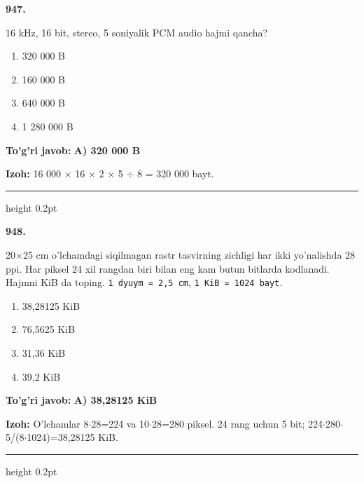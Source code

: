 \documentclass[10pt,a4paper,oneside]{article}
\begin{document}
\noindent\textbf{\color{ink}947.}
\par
16 kHz, 16 bit, stereo, 5 soniyalik PCM audio hajmi qancha?
\begin{enumerate}[label=\Alph*),leftmargin=9mm]
\item 320 000 B
\item 160 000 B
\item 640 000 B
\item 1 280 000 B
\end{enumerate}
\begin{tcolorbox}[enhanced,breakable,colback=teal!4,colframe=teal!50!black,boxrule=0.5pt,arc=1.1mm,left=3mm,right=3mm,top=1.7mm,bottom=1.7mm,before skip=2mm,after skip=2mm]
\textbf{\color{teal}To'g'ri javob:} \textbf{A) 320 000 B}
\par\smallskip
\textbf{Izoh:} 16 000 \ensuremath{\times} 16 \ensuremath{\times} 2 \ensuremath{\times} 5 \ensuremath{\div} 8 = 320 000 bayt.
\end{tcolorbox}
\vspace{2mm}\hrule height 0.2pt \vspace{3mm}

\noindent\textbf{\color{ink}948.}
\par
20\ensuremath{\times}25 cm o'lchamdagi siqilmagan rastr tasvirning zichligi har ikki yo'nalishda 28 ppi. Har piksel 24 xil rangdan biri bilan eng kam butun bitlarda kodlanadi. Hajmni KiB da toping. \texttt{1 dyuym = 2,5 cm}, \texttt{1 KiB = 1024 bayt}.
\begin{enumerate}[label=\Alph*),leftmargin=9mm]
\item 38,28125 KiB
\item 76,5625 KiB
\item 31,36 KiB
\item 39,2 KiB
\end{enumerate}
\begin{tcolorbox}[enhanced,breakable,colback=teal!4,colframe=teal!50!black,boxrule=0.5pt,arc=1.1mm,left=3mm,right=3mm,top=1.7mm,bottom=1.7mm,before skip=2mm,after skip=2mm]
\textbf{\color{teal}To'g'ri javob:} \textbf{A) 38,28125 KiB}
\par\smallskip
\textbf{Izoh:} O'lchamlar 8\ensuremath{\cdot}28=224 va 10\ensuremath{\cdot}28=280 piksel. 24 rang uchun 5 bit; 224\ensuremath{\cdot}280\ensuremath{\cdot}5/(8\ensuremath{\cdot}1024)=38,28125 KiB.
\end{tcolorbox}
\vspace{2mm}\hrule height 0.2pt \vspace{3mm}
\end{document}
